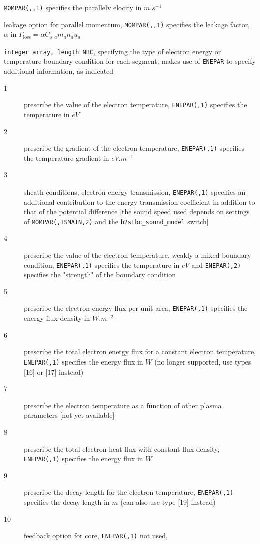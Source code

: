 \documentclass[a4paper,10pt]{report}
\begin{document}
\begin{description}
\begin{description}
  {\tt MOMPAR(,,1)} specifies the parallelv elocity in $m.s^{-1}$
  \item[17] leakage option for parallel momentum, {\tt MOMPAR(,,1)} specifies
  the leakage factor, $\alpha$ in $\Gamma_{\mbox{loss}} = \alpha C_{s, a} m_a n_a u_a$
  \end{description}
\item[BCENE] {\tt integer array, length NBC}, specifying
  the type of electron energy or temperature boundary condition for
  each segment; makes use of {\tt ENEPAR} to specify additional
  information, as indicated
  \begin{description}
  \item[1] prescribe the value of the electron temperature,
  {\tt ENEPAR(,1)} specifies the temperature in $eV$
  \item[2] prescribe the gradient of the electron temperature,
  {\tt ENEPAR(,1)} specifies the temperature gradient in $eV.m^{-1}$
  \item[3] sheath conditions, electron energy transmission,
  {\tt ENEPAR(,1)} specifies an additional contribution to the energy
  transmission coefficient in addition to that of the potential
  difference [the sound speed used depends on settings of
  {\tt MOMPAR(,ISMAIN,2)} and the {\tt \allowbreak b2stbc\_sound\_model} switch]
  \item[4] prescribe the value of the electron temperature, weakly a
  mixed boundary condition, {\tt ENEPAR(,1)} specifies the
  temperature in $eV$ and {\tt ENEPAR(,2)} specifies the
  "strength" of the boundary condition
  \item[5] prescribe the electron energy flux per unit area,
  {\tt ENEPAR(,1)} specifies the energy flux density in $W.m^{-2}$
  \item[6] prescribe the total electron energy flux for a constant
  electron temperature, {\tt ENEPAR(,1)} specifies the energy flux
  in $W$ (no longer supported, use types [16] or [17] instead)
  \item[7] prescribe the electron temperature as a function of
  other plasma parameters [not yet available]
  \item[8] prescribe the total electron heat flux with constant flux
  density, {\tt ENEPAR(,1)} specifies the energy flux in $W$
  \item[9] prescribe the decay length for the electron temperature,
  {\tt ENEPAR(,1)} specifies the decay length in $m$ (can also use type [19] instead)
  \item[10] feedback option for core, {\tt ENEPAR(,1)} not used,

\end{description}
\end{description}
\end{document}
